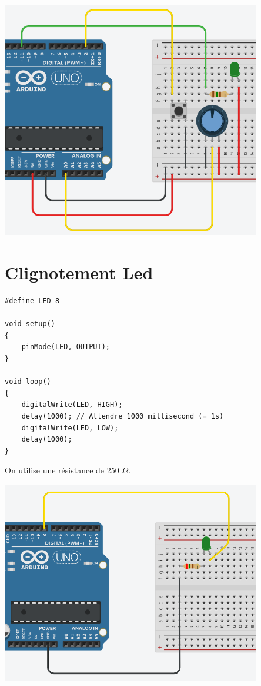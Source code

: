 \documentclass[a4paper]{article}
\begin{document}
\begin{center}
    \includegraphics[width=0.85\textwidth]{images/labo1-manip4.PNG}
\end{center}










\section{Clignotement Led}





\begin{lstlisting}[frame=single]
#define LED 8

void setup()
{
    pinMode(LED, OUTPUT);
}

void loop()
{
    digitalWrite(LED, HIGH);
    delay(1000); // Attendre 1000 millisecond (= 1s)
    digitalWrite(LED, LOW);
    delay(1000);
}
\end{lstlisting}

On utilise une résistance de 250 $ \Omega $.
\begin{center}
    \includegraphics[width=0.85\textwidth]{images/labo1-manip6.PNG}
\end{center}
\end{document}

